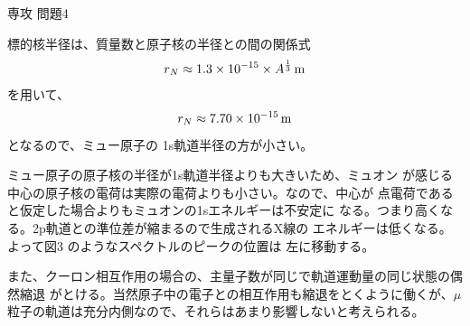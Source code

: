 \documentclass[fleqn]{jbook}
\begin{document}
\begin{answer}{専攻 問題4}{}
\begin{subanswers}
  標的核半径は、質量数と原子核の半径との間の関係式
%
  \[ r_N \approx 1.3 \times 10^{-15} \times A^\frac{1}{3} \,{\rm m} \]
%
  を用いて、
%
  \[ r_N \approx 7.70 \times 10^{-15}\,{\rm m} \]
%
  となるので、ミュー原子の 1s軌道半径の方が小さい。


\SubAnswer
  ミュー原子の原子核の半径が1s軌道半径よりも大きいため、ミュオン
  が感じる中心の原子核の電荷は実際の電荷よりも小さい。なので、中心が
  点電荷であると仮定した場合よりもミュオンの1sエネルギーは不安定に
  なる。つまり高くなる。2p軌道との準位差が縮まるので生成されるX線の
  エネルギーは低くなる。よって図3 のようなスペクトルのピークの位置は
  左に移動する。

  また、クーロン相互作用の場合の、主量子数が同じで軌道運動量の同じ状態の偶然縮退  がとける。当然原子中の電子との相互作用も縮退をとくように働くが、$\mu$粒子の軌道は充分内側なので、それらはあまり影響しないと考えられる。
\end{subanswers}
\end{answer}
\end{document}
